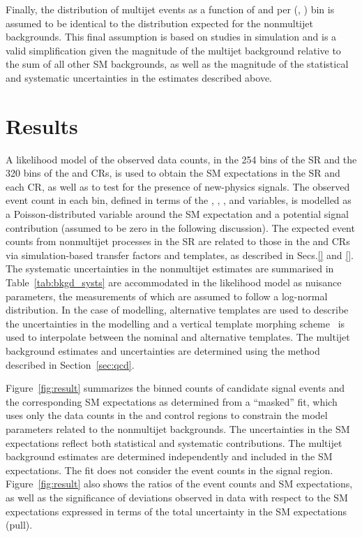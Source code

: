 Finally, the distribution of multijet events as a function of \nb and
\mht per (\njet, \scalht) bin is assumed to be identical to the
distribution expected for the nonmultijet backgrounds. This final
assumption is based on studies in simulation and is a valid
simplification given the magnitude of the multijet background relative
to the sum of all other SM backgrounds, as well as the magnitude of
the statistical and systematic uncertainties in the estimates
described above.


\clearpage
\section{Results}
\label{sec:result}

A likelihood model of the observed data counts, in the 254 bins of the
SR and the 320 bins of the \mj and \mmj CRs, is used to obtain the SM
expectations in the SR and each CR, as well as to test for the
presence of new-physics signals. The observed event count in each bin,
defined in terms of the \njet, \nb, \scalht, and \mht variables, is
modelled as a Poisson-distributed variable around the SM expectation
and a potential signal contribution (assumed to be zero in the
following discussion). The expected event counts from nonmultijet
processes in the SR are related to those in the \mj and \mmj CRs via
simulation-based transfer factors and templates, as described in
Secs.\ref{} and \ref{}. The systematic uncertainties in the
nonmultijet estimates are summarised in Table~\ref{tab:bkgd_systs} are
accommodated in the likelihood model as nuisance parameters, the
measurements of which are assumed to follow a log-normal
distribution. In the case of \mht modelling, alternative templates are
used to describe the uncertainties in the \mht modelling and a
vertical template morphing scheme~\cite{Prosper:2011zz, RA1Paper2015}
is used to interpolate between the nominal and alternative
templates. The multijet background estimates and uncertainties are
determined using the method described in Section~\ref{sec:qcd}.

Figure~\ref{fig:result} summarizes the binned counts of candidate
signal events and the corresponding SM expectations as determined from
a ``masked'' fit, which uses only the data counts in the \mj and \mmj
control regions to constrain the model parameters related to the
nonmultijet backgrounds. The uncertainties in the SM expectations
reflect both statistical and systematic contributions. The multijet
background estimates are determined independently and included in the
SM expectations. The fit does not consider the event counts in the
signal region. Figure~\ref{fig:result} also shows the ratios of the
event counts and SM expectations, as well as the significance of
deviations observed in data with respect to the SM expectations
expressed in terms of the total uncertainty in the SM expectations
(pull). 

